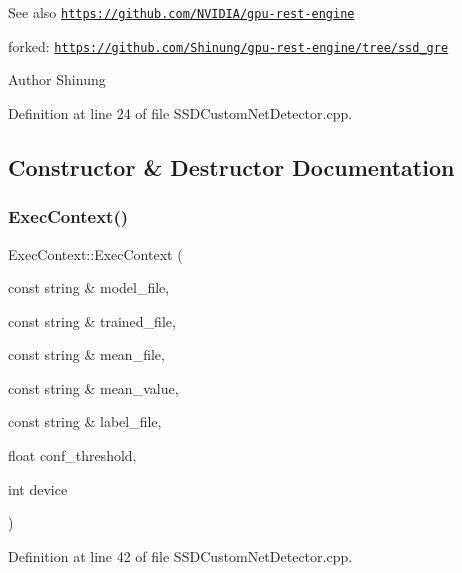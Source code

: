 \begin{DoxySeeAlso}{See also}
\href{https://github.com/NVIDIA/gpu-rest-engine}{\tt https\+://github.\+com/\+N\+V\+I\+D\+I\+A/gpu-\/rest-\/engine} 

forked\+: \href{https://github.com/Shinung/gpu-rest-engine/tree/ssd_gre}{\tt https\+://github.\+com/\+Shinung/gpu-\/rest-\/engine/tree/ssd\+\_\+gre} 
\end{DoxySeeAlso}
\begin{DoxyAuthor}{Author}
Shinung 
\end{DoxyAuthor}


Definition at line 24 of file S\+S\+D\+Custom\+Net\+Detector.\+cpp.



\subsection{Constructor \& Destructor Documentation}
\mbox{\label{class_exec_context_a88e6438e9e4bba24c27aa02ee5d40bd5}} 
\subsubsection{\texorpdfstring{Exec\+Context()}{ExecContext()}}
{\footnotesize\ttfamily Exec\+Context\+::\+Exec\+Context (\begin{DoxyParamCaption}\item[{const string \&}]{model\+\_\+file,  }\item[{const string \&}]{trained\+\_\+file,  }\item[{const string \&}]{mean\+\_\+file,  }\item[{const string \&}]{mean\+\_\+value,  }\item[{const string \&}]{label\+\_\+file,  }\item[{float}]{conf\+\_\+threshold,  }\item[{int}]{device }\end{DoxyParamCaption})\hspace{0.3cm}{\ttfamily [inline]}}



Definition at line 42 of file S\+S\+D\+Custom\+Net\+Detector.\+cpp.


